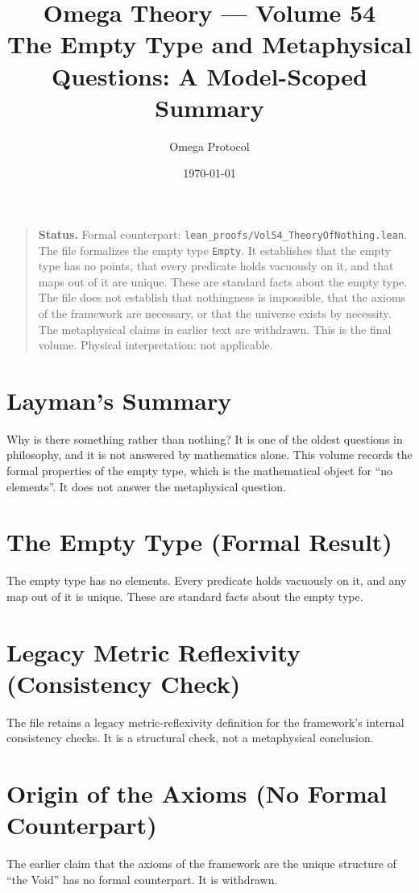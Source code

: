 \documentclass[11pt, a4paper]{article}
\title{Omega Theory --- Volume 54\\\Large The Empty Type and Metaphysical Questions: A Model-Scoped Summary}
\author{Omega Protocol}
\date{\today}
\begin{document}
\maketitle

\begin{quote}
\textbf{Status.} Formal counterpart: \texttt{lean\_proofs/Vol54\_TheoryOfNothing.lean}. The file formalizes the empty type \texttt{Empty}. It establishes that the empty type has no points, that every predicate holds vacuously on it, and that maps out of it are unique. These are standard facts about the empty type. The file does not establish that nothingness is impossible, that the axioms of the framework are necessary, or that the universe exists by necessity. The metaphysical claims in earlier text are withdrawn. This is the final volume. Physical interpretation: not applicable.
\end{quote}

\section*{Layman's Summary}
Why is there something rather than nothing? It is one of the oldest questions in philosophy, and it is not answered by mathematics alone. This volume records the formal properties of the empty type, which is the mathematical object for ``no elements''. It does not answer the metaphysical question.

\section{The Empty Type (Formal Result)}
The empty type has no elements. Every predicate holds vacuously on it, and any map out of it is unique. These are standard facts about the empty type.

\section{Legacy Metric Reflexivity (Consistency Check)}
The file retains a legacy metric-reflexivity definition for the framework's internal consistency checks. It is a structural check, not a metaphysical conclusion.

\section{Origin of the Axioms (No Formal Counterpart)}
The earlier claim that the axioms of the framework are the unique structure of ``the Void'' has no formal counterpart. It is withdrawn.
\end{document}
